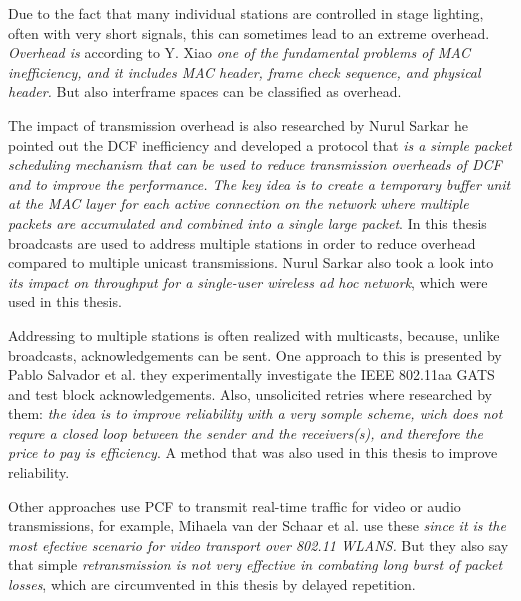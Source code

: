 Due to the fact that many individual stations are controlled in stage lighting, 
often with very short signals, this can sometimes lead to an extreme overhead.
\emph{Overhead is} 
according to Y. Xiao \cite{PerformanceEnhancement}
\emph{one of the fundamental problems of MAC inefficiency, and it includes MAC header, frame check sequence, and physical header.}
But also interframe spaces can be classified as overhead.

The impact of transmission overhead is also researched by Nurul Sarkar \cite{TheImpactOfOverheads}
he pointed out the DCF inefficiency and developed a protocol that
\emph{is a simple packet scheduling mechanism that can be used to reduce transmission overheads of DCF and to improve the performance. 
The key idea is to create a temporary buffer unit at the MAC layer for each active connection on the network 
where multiple packets are accumulated and combined into a single large packet}.
In this thesis broadcasts are used to address multiple stations 
in order to reduce overhead compared to multiple unicast transmissions.
Nurul Sarkar \cite{TheImpactOfOverheads} also took a look into 
\emph{its impact on throughput for a single-user wireless ad hoc network},
which were used in this thesis.

Addressing to multiple stations is often realized with multicasts, 
because, unlike broadcasts, acknowledgements can be sent. One approach to this is presented by Pablo Salvador et al. 
\cite{AFirstImplementation}
they experimentally investigate the IEEE 802.11aa GATS and test block acknowledgements.
Also, unsolicited retries where researched by them: 
\emph{the idea is to improve reliability with a very somple scheme, wich does not requre a 
closed loop between the sender and the receivers(s), and therefore the price to pay is efficiency}.
A method that was also used in this thesis to improve reliability.

Other approaches use PCF to transmit real-time traffic for video or audio transmissions,
for example, Mihaela van der Schaar et al. \cite{AdaptiveCrossLayer} use these 
\emph{since it is the most efective scenario for video transport over 802.11 WLANS.}
But they also say that simple 
\emph{retransmission is not very effective in combating long burst of packet losses},
which are circumvented in this thesis by delayed repetition.



